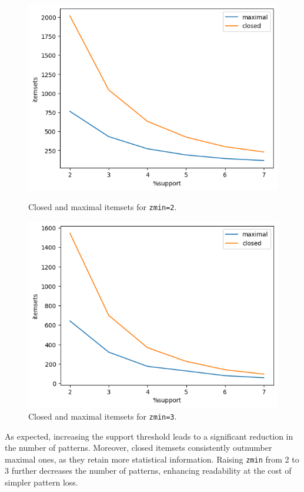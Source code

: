 \documentclass[10pt]{article}
\begin{document}
\begin{figure}[H]
\centering
\begin{minipage}{0.38\textwidth}
  \includegraphics[width=\linewidth]{zmin2.png}
  \caption{Closed and maximal itemsets for \texttt{zmin=2}.}
  \label{fig:itemset_zmin2}
\end{minipage}
\hfill
\begin{minipage}{0.38\textwidth}
  \includegraphics[width=\linewidth]{zmin3.png}
  \caption{Closed and maximal itemsets for \texttt{zmin=3}.}
  \label{fig:itemset_zmin3}
\end{minipage}
\end{figure}

As expected, increasing the support threshold leads to a significant reduction in the number of patterns. Moreover, closed itemsets consistently outnumber maximal ones, as they retain more statistical information. Raising \texttt{zmin} from 2 to 3 further decreases the number of patterns, enhancing readability at the cost of simpler pattern loss.
\end{document}
